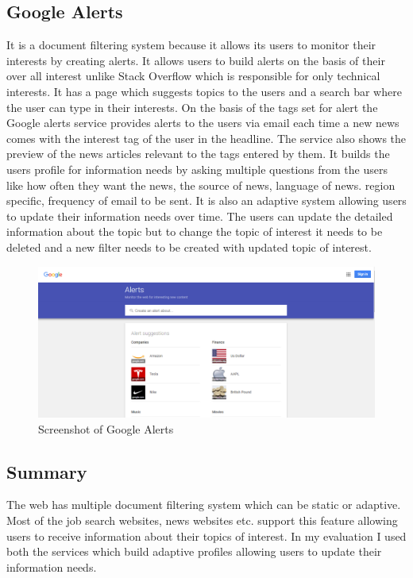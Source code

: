 \documentclass[12pt]{report}
\begin{document}
\subsection{Google Alerts}
 It is a document filtering system because it allows its users to monitor their interests by creating alerts. It allows users to build alerts on the basis of their over all interest unlike Stack Overflow which is responsible for only technical interests. It has a page which suggests topics to the users and a search bar where the user can type in their interests. On the basis of the tags set for alert the Google alerts service provides alerts to the users via email each time a new news comes with the interest tag of the user in the headline. The service also shows the preview of the news articles relevant to the tags entered by them. It builds the users profile for information needs by asking multiple questions from the users like how often they want the news, the source of news, language of news. region specific, frequency of email to be sent. It is also an adaptive system allowing users to update their information needs over time. The users can update the detailed information about the topic but to change the topic of interest it needs to be deleted and a new filter needs to be created with updated topic of interest.

\begin{figure}[ht]
  \centering
  \includegraphics[width=1\textwidth]{Problem10_6/GoogleAlerts.png}
  \caption{Screenshot of Google Alerts}
  \label{fig:1}
\end{figure}  

\subsection{Summary}
The web has multiple document filtering system which can be static or adaptive. Most of the job search websites, news websites etc. support this feature allowing users to receive information about their topics of interest. In my evaluation I used both the services which build adaptive profiles allowing users to update their information needs.
\end{document}
